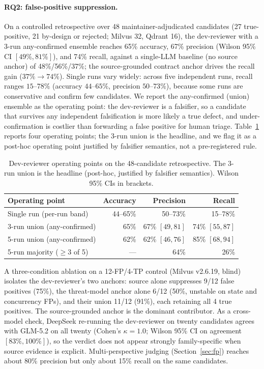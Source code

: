 \documentclass[sigconf]{acmart}
\begin{document}
\paragraph{RQ2: false-positive suppression.}
On a controlled retrospective over 48 maintainer-adjudicated candidates (27 true-positive, 21 by-design or rejected; Milvus 32, Qdrant 16), the dev-reviewer with a 3-run any-confirmed ensemble reaches 65\% accuracy, 67\% precision (Wilson 95\% CI $[49\%, 81\%]$), and 74\% recall, against a single-LLM baseline (no source anchor) of 48\%/56\%/37\%; the source-grounded contract anchor drives the recall gain ($37\%\to74\%$). Single runs vary widely: across five independent runs, recall ranges $15$--$78\%$ (accuracy $44$--$65\%$, precision $50$--$73\%$), because some runs are conservative and confirm few candidates. We report the any-confirmed (union) ensemble as the operating point: the dev-reviewer is a falsifier, so a candidate that survives any independent falsification is more likely a true defect, and under-confirmation is costlier than forwarding a false positive for human triage. Table~\ref{tab:opr} reports four operating points; the 3-run union is the headline, and we flag it as a post-hoc operating point justified by falsifier semantics, not a pre-registered rule.

\begin{table}[t]
\caption{Dev-reviewer operating points on the 48-candidate retrospective. The 3-run union is the headline (post-hoc, justified by falsifier semantics). Wilson 95\% CIs in brackets.}
\label{tab:opr}
\small
\begin{tabular}{@{}lrrr@{}}
\toprule
Operating point & Accuracy & Precision & Recall \\
\midrule
Single run (per-run band) & 44--65\% & 50--73\% & 15--78\% \\
3-run union (any-confirmed) & 65\% & 67\% $[49, 81]$ & 74\% $[55, 87]$ \\
5-run union (any-confirmed) & 62\% & 62\% $[46, 76]$ & 85\% $[68, 94]$ \\
5-run majority ($\ge 3$ of 5) & --- & 64\% & 26\% \\
\bottomrule
\end{tabular}
\end{table}

A three-condition ablation on a 12-FP/4-TP control (Milvus v2.6.19, blind) isolates the dev-reviewer's two anchors: source alone suppresses 9/12 false positives (75\%), the threat-model anchor alone 6/12 (50\%, unstable on state and concurrency FPs), and their union 11/12 (91\%), each retaining all 4 true positives. The source-grounded anchor is the dominant contributor. As a cross-model check, DeepSeek re-running the dev-reviewer on twenty candidates agrees with GLM-5.2 on all twenty (Cohen's $\kappa = 1.0$; Wilson 95\% CI on agreement $[83\%, 100\%]$), so the verdict does not appear strongly family-specific when source evidence is explicit. Multi-perspective judging (Section~\ref{sec:fp}) reaches about 80\% precision but only about 15\% recall on the same candidates.
\end{document}
